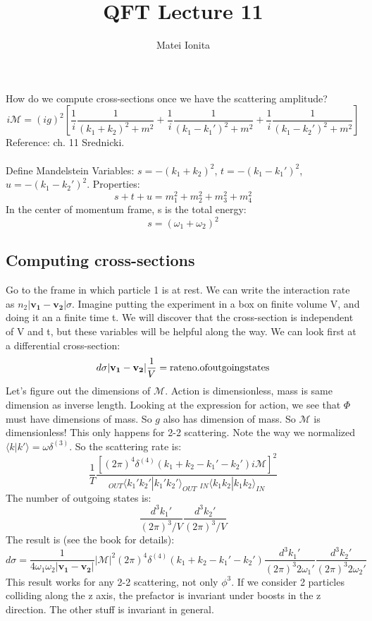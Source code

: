 \documentclass[12 pt]{article}
\title{QFT Lecture 11}
\author{Matei Ionita}
\begin{document}
  \maketitle

How do we compute cross-sections once we have the scattering amplitude?
\[   i\mathcal{M} = (ig)^2 \left[ \frac{1}{i} \frac{1}{(k_1+k_2)^2 +m^2} + \frac{1}{i}\frac{1}{(k_1-k_1')^2 + m^2} +  \frac{1}{i}\frac{1}{(k_1-k_2')^2 + m^2}\right]  \]
Reference: ch. 11 Srednicki.
\\
\\
Define Mandelstein Variables: $s = - (k_1 + k_2)^2$, $t= - (k_1-k_1')^2$, $u = - (k_1-k_2')^2$. Properties:
\[   s + t + u = m_1^2 + m_2^2 + m_3^2 + m_4^2  \]
In the center of momentum frame, s is the total energy:
\[  s = (\omega_1 + \omega_2)^2  \]

\subsection*{Computing cross-sections}
Go to the frame in which particle 1 is at rest. We can write the interaction rate as $n_2 |\mathbf{v_1 - v_2}| \sigma$. Imagine putting the experiment in a box on finite volume V, and doing it an a finite time t. We will discover that the cross-section is independent of V and t, but these variables will be helpful along the way. We can look first at a differential cross-section:
\[   d\sigma | \mathbf{v_1 - v_2} | \frac{1}{V} = \rm{rate} \rm {no. of outgoing states}  \]
Let's figure out the dimensions of $\mathcal{M}$. Action is dimensionless, mass is same dimension as inverse length. Looking at the expression for action, we see that $\Phi$ must have dimensions of mass. So $g$ also has dimension of mass. So $\mathcal{M}$ is dimensionless! This only happens for 2-2 scattering. Note  the way we normalized $\langle k|k'\rangle = \omega \delta^{(3)}$. So the scattering rate is:
\[    \frac{1}{T} \frac{\left[  (2\pi)^4 \delta^{(4)}(k_1+k_2-k_1'-k_2') i \mathcal{M}  \right]^2}{_{OUT}\langle k_1' k_2' | k_1' k_2' \rangle_{OUT}\; {} _{IN}\langle k_1 k_2 | k_1 k_2 \rangle_{IN}}   \]
The number of outgoing states is:
\[   \frac{d^3 k_1'}{(2\pi)^3/V} \frac{d^3 k_2'}{(2\pi)^3/V}  \]
The result is (see the book for details):
\[   d\sigma = \frac{1}{4\omega_1 \omega_2 |\mathbf{v_1 - v_2}|} |\mathcal{M}|^2 (2\pi)^4 \delta^{(4)}(k_1 + k_2 - k_1' - k_2')   \frac{d^3 k_1'}{(2\pi)^3 2\omega_1'} \frac{d^3 k_2'}{(2\pi)^3 2\omega_2'}   \]
This result works for any 2-2 scattering, not only $\phi^3$. If we consider 2 particles colliding along the z axis, the prefactor is invariant under boosts in the z direction. The other stuff is invariant in general.
\end{document}
